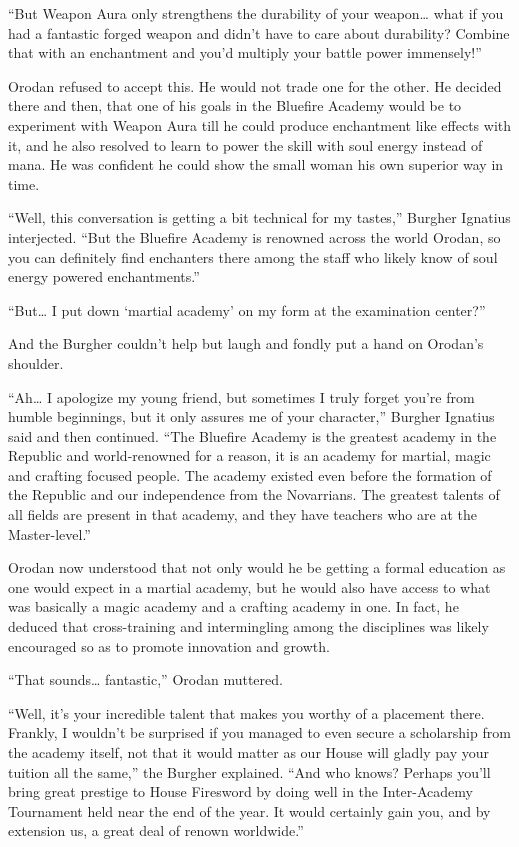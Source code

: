 \documentclass[a4paper,10pt]{book}
\begin{document}
“But Weapon Aura only strengthens the durability of your weapon… what if you had a fantastic forged weapon and didn’t have to care about durability? Combine that with an enchantment and you’d multiply your battle power immensely!”\par
Orodan refused to accept this. He would not trade one for the other. He decided there and then, that one of his goals in the Bluefire Academy would be to experiment with Weapon Aura till he could produce enchantment like effects with it, and he also resolved to learn to power the skill with soul energy instead of mana. He was confident he could show the small woman his own superior way in time.\par
“Well, this conversation is getting a bit technical for my tastes,” Burgher Ignatius interjected. “But the Bluefire Academy is renowned across the world Orodan, so you can definitely find enchanters there among the staff who likely know of soul energy powered enchantments.”\par
“But… I put down ‘martial academy’ on my form at the examination center?”\par
And the Burgher couldn’t help but laugh and fondly put a hand on Orodan’s shoulder.\par
“Ah… I apologize my young friend, but sometimes I truly forget you’re from humble beginnings, but it only assures me of your character,” Burgher Ignatius said and then continued. “The Bluefire Academy is the greatest academy in the Republic and world-renowned for a reason, it is an academy for martial, magic and crafting focused people. The academy existed even before the formation of the Republic and our independence from the Novarrians. The greatest talents of all fields are present in that academy, and they have teachers who are at the Master-level.”\par
Orodan now understood that not only would he be getting a formal education as one would expect in a martial academy, but he would also have access to what was basically a magic academy and a crafting academy in one. In fact, he deduced that cross-training and intermingling among the disciplines was likely encouraged so as to promote innovation and growth.\par
“That sounds… fantastic,” Orodan muttered.\par
“Well, it’s your incredible talent that makes you worthy of a placement there. Frankly, I wouldn’t be surprised if you managed to even secure a scholarship from the academy itself, not that it would matter as our House will gladly pay your tuition all the same,” the Burgher explained. “And who knows? Perhaps you’ll bring great prestige to House Firesword by doing well in the Inter-Academy Tournament held near the end of the year. It would certainly gain you, and by extension us, a great deal of renown worldwide.”\par
\end{document}
